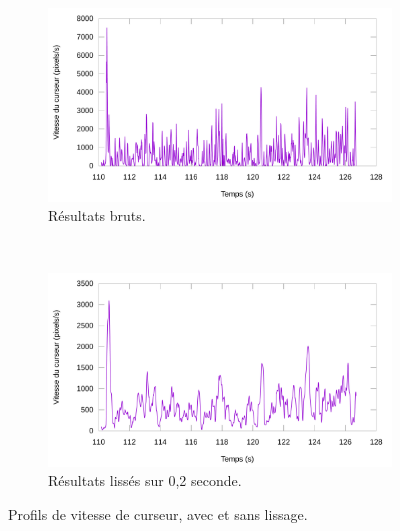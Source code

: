 	\begin{figure}[htbp]
		\begin{subfigure}[t]{\textwidth}
			\centering
			\includegraphics[width=\textwidth]{figures/ch5/profile}
			\caption{Résultats bruts.}
			\label{fig:profile}
		\end{subfigure}
		~
		\begin{subfigure}[t]{\textwidth}
			\centering
			\includegraphics[width=\textwidth]{figures/ch5/profile1}
			\caption{Résultats lissés sur 0,2 seconde.}
			\label{fig:profile1}
		\end{subfigure}
		\caption[Profils de vitesse de curseurs]{Profils de vitesse de curseur, avec et sans lissage.}
		\label{fig:asProfiles}
	\end{figure}
	
	

